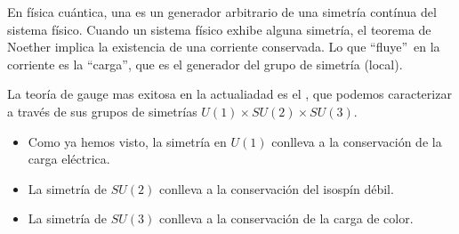En física cuántica, una  es un generador arbitrario de una simetría contínua del sistema físico.
Cuando un sistema físico exhibe alguna simetría, el teorema de Noether implica la existencia de una corriente conservada.
Lo que \textquotedblleft fluye\textquotedblright\ en la corriente es la \textquotedblleft carga\textquotedblright, que es el generador del grupo de simetría (local).


La teoría de gauge mas exitosa en la actualiadad es el , que podemos caracterizar a través de sus grupos de simetrías $U(1)\times SU(2)\times SU(3)$.

\begin{itemize}
	\item Como ya hemos visto, la simetría en $U(1)$ conlleva a la conservación de la carga eléctrica.
	\item La simetría de $SU(2)$ conlleva a la conservación del isospín débil.
	\item La simetría de $SU(3)$ conlleva a la conservación de la carga de color.
\end{itemize}
